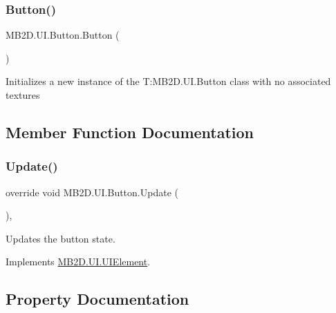 \subsubsection{\texorpdfstring{Button()}{Button()}\hspace{0.1cm}{\footnotesize\ttfamily [2/2]}}
{\footnotesize\ttfamily M\+B2\+D.\+U\+I.\+Button.\+Button (\begin{DoxyParamCaption}{ }\end{DoxyParamCaption})\hspace{0.3cm}{\ttfamily [inline]}}



Initializes a new instance of the T\+:\+M\+B2\+D.\+U\+I.\+Button class with no associated textures 



\subsection{Member Function Documentation}
\hypertarget{class_m_b2_d_1_1_u_i_1_1_button_a1686d24f172e05a1bf83fc3aa49cfab5}{}\label{class_m_b2_d_1_1_u_i_1_1_button_a1686d24f172e05a1bf83fc3aa49cfab5} 
\subsubsection{\texorpdfstring{Update()}{Update()}}
{\footnotesize\ttfamily override void M\+B2\+D.\+U\+I.\+Button.\+Update (\begin{DoxyParamCaption}{ }\end{DoxyParamCaption})\hspace{0.3cm}{\ttfamily [inline]}, {\ttfamily [virtual]}}



Updates the button state. 



Implements \hyperlink{class_m_b2_d_1_1_u_i_1_1_u_i_element_aa97bcbe44f3fac8a13e2febca23b2d4d}{M\+B2\+D.\+U\+I.\+U\+I\+Element}.



\subsection{Property Documentation}
\hypertarget{class_m_b2_d_1_1_u_i_1_1_button_a92d0184df7962dd2aed3b8b0aa8c0d8e}{}\label{class_m_b2_d_1_1_u_i_1_1_button_a92d0184df7962dd2aed3b8b0aa8c0d8e} 
